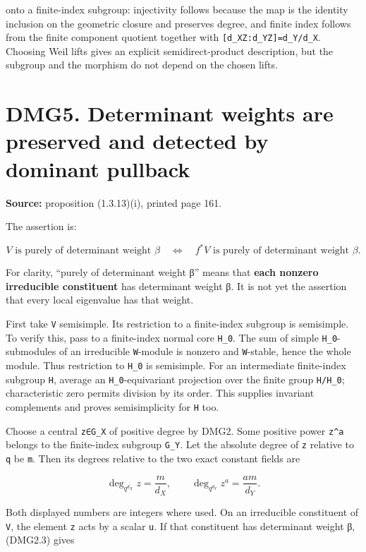 \documentclass[
]{report}
\begin{document}
onto a finite-index subgroup: injectivity follows because the map is the
identity inclusion on the geometric closure and preserves degree, and
finite index follows from the finite component quotient together with
\texttt{{[}d\_XZ:d\_YZ{]}=d\_Y/d\_X}. Choosing Weil lifts gives an
explicit semidirect-product description, but the subgroup and the
morphism do not depend on the chosen lifts.

\section{DMG5. Determinant weights are preserved and detected by
dominant
pullback}\label{dmg5.-determinant-weights-are-preserved-and-detected-by-dominant-pullback}

\textbf{Source:} proposition (1.3.13)(i), printed page 161.

The assertion is:

\[
V\text{ is purely of determinant weight }\beta
\quad\Longleftrightarrow\quad
f^*V\text{ is purely of determinant weight }\beta.
\tag{DMG5.1}
\]

For clarity, ``purely of determinant weight β'' means that \textbf{each
nonzero irreducible constituent} has determinant weight β. It is not yet
the assertion that every local eigenvalue has that weight.

First take \texttt{V} semisimple. Its restriction to a finite-index
subgroup is semisimple. To verify this, pass to a finite-index normal
core \texttt{H\_0}. The sum of simple \texttt{H\_0}-submodules of an
irreducible \texttt{W}-module is nonzero and \texttt{W}-stable, hence
the whole module. Thus restriction to \texttt{H\_0} is semisimple. For
an intermediate finite-index subgroup \texttt{H}, average an
\texttt{H\_0}-equivariant projection over the finite group
\texttt{H/H\_0}; characteristic zero permits division by its order. This
supplies invariant complements and proves semisimplicity for \texttt{H}
too.

Choose a central \texttt{z∈G\_X} of positive degree by DMG2. Some
positive power \texttt{z\^{}a} belongs to the finite-index subgroup
\texttt{G\_Y}. Let the absolute degree of \texttt{z} relative to
\texttt{q} be \texttt{m}. Then its degrees relative to the two exact
constant fields are

\[
\deg_{q^{d_X}}z=\frac{m}{d_X},\qquad
\deg_{q^{d_Y}}z^a=\frac{am}{d_Y}.
\tag{DMG5.2}
\]

Both displayed numbers are integers where used. On an irreducible
constituent of \texttt{V}, the element \texttt{z} acts by a scalar
\texttt{u}. If that constituent has determinant weight β, (DMG2.3) gives
\end{document}
